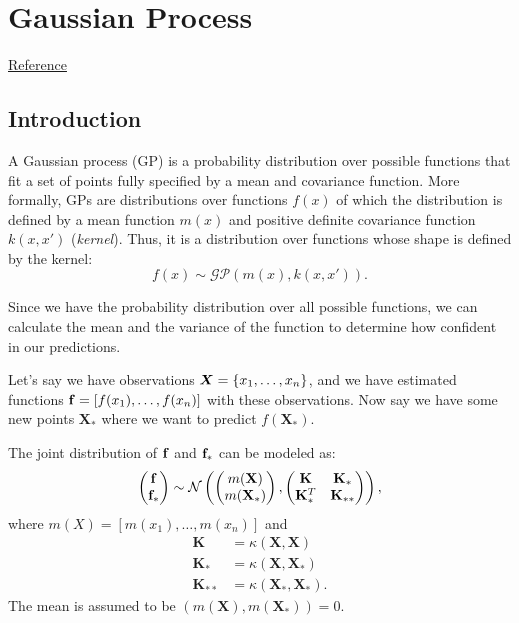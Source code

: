 \chapter{Gaussian Process}
\href{https://github.com/jwangjie/Gaussian-Process-Regression-Tutorial}{Reference}

\section{Introduction}
\label{sec:gaussian_process}
A Gaussian process (GP) is a probability distribution over possible functions that fit a set of points fully specified by a mean and covariance function. More formally, GPs are distributions over functions $f(x)$ of which the distribution is defined by a mean function $m(x)$ and positive definite covariance function $k(x,x')$ (\ie \textit{kernel}). Thus, it is a distribution over functions whose shape is defined by the kernel:
$$f(x) \sim \mathcal{GP}(m(x),k(x,x')).$$

Since we have the probability distribution over all possible functions, we can calculate the mean and the variance of the function to determine how confident in our predictions.

Let's say we have observations ${\bm{X}}=\{x_1, \dots, x_n\}$, and we have estimated functions ${\mathbf{f}} = [f(x_1), \dots, f(x_n)]$ with these observations. Now say we have some new points $\mathbf{X}_*$ where we want to predict $f(\mathbf{X}_*)$.

The joint distribution of ${\mathbf{f}}$ and ${\mathbf{f}}_*$ can be modeled as:
\begin{align*}
	\begin{pmatrix}
		{\mathbf{f}}\\
		{\mathbf{f}}_*
		\end{pmatrix}\sim \mathcal{N} 
		\begin{pmatrix}
		\begin{pmatrix}
			m(\mathbf{X})\\
			m(\mathbf{X}_*)
		\end{pmatrix},
		\begin{pmatrix}
			\mathbf{K} & \mathbf{K}_*\\
			\mathbf{K}_*^T & \mathbf{K}_{**}
		\end{pmatrix}
		\end{pmatrix},
\end{align*}
where $m(X) = [m(x_1),\dots, m(x_n)]$ and
\begin{align*}
	\mathbf{K }&= \kappa(\mathbf{X,X})\\
	\mathbf{K}_* &= \kappa(\mathbf{X},\mathbf{X}_*)\\
	\mathbf{K}_{**} &= \kappa(\mathbf{X}_*,\mathbf{X}_*).
\end{align*}
The mean is assumed to be $(m(\mathbf{X}), m(\mathbf{X}_*))=0$. 

